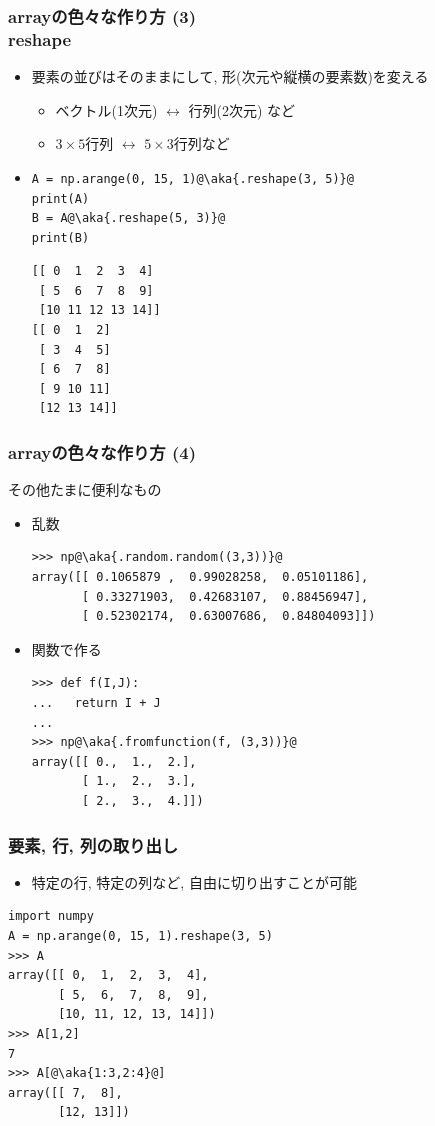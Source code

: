 \documentclass[10pt,dvipdfmx]{beamer}
\newcommand{\aka}[1]{{\color{red}#1}}
\begin{document}
\begin{frame}[fragile]
\frametitle{arrayの色々な作り方 (3) \\
reshape}

\begin{itemize}
\item 要素の並びはそのままにして, 形(次元や縦横の要素数)を変える
  \begin{itemize}
  \item ベクトル(1次元) $\leftrightarrow$ 行列(2次元) など
  \item $3\times 5$行列 $\leftrightarrow$ $5\times 3$行列など
  \end{itemize}
\item 
\begin{lstlisting}
A = np.arange(0, 15, 1)@\aka{.reshape(3, 5)}@
print(A)
B = A@\aka{.reshape(5, 3)}@
print(B)
\end{lstlisting}

\begin{lstlisting}
[[ 0  1  2  3  4]
 [ 5  6  7  8  9]
 [10 11 12 13 14]]
[[ 0  1  2]
 [ 3  4  5]
 [ 6  7  8]
 [ 9 10 11]
 [12 13 14]]
\end{lstlisting}
\end{itemize}
\end{frame}

\begin{frame}[fragile]
\frametitle{arrayの色々な作り方 (4)}
その他たまに便利なもの

\begin{itemize}
\item 乱数
\begin{lstlisting}
>>> np@\aka{.random.random((3,3))}@
array([[ 0.1065879 ,  0.99028258,  0.05101186],
       [ 0.33271903,  0.42683107,  0.88456947],
       [ 0.52302174,  0.63007686,  0.84804093]])
\end{lstlisting}

\item 関数で作る
\begin{lstlisting}
>>> def f(I,J):
...   return I + J
... 
>>> np@\aka{.fromfunction(f, (3,3))}@
array([[ 0.,  1.,  2.],
       [ 1.,  2.,  3.],
       [ 2.,  3.,  4.]])
\end{lstlisting}
     
\end{itemize}
\end{frame}


\begin{frame}[fragile]
\frametitle{要素, 行, 列の取り出し}
\begin{itemize}
\item 特定の行, 特定の列など, 自由に切り出すことが可能
\end{itemize}

\begin{lstlisting}
import numpy
A = np.arange(0, 15, 1).reshape(3, 5)
>>> A
array([[ 0,  1,  2,  3,  4],
       [ 5,  6,  7,  8,  9],
       [10, 11, 12, 13, 14]])
>>> A[1,2]
7
>>> A[@\aka{1:3,2:4}@]
array([[ 7,  8],
       [12, 13]])
\end{lstlisting}
\end{frame}
\end{document}
